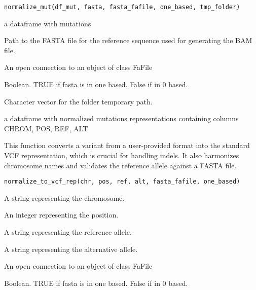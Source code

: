\documentclass[a4paper]{book}
\begin{document}
%
\begin{Usage}
\begin{verbatim}
normalize_mut(df_mut, fasta, fasta_fafile, one_based, tmp_folder)
\end{verbatim}
\end{Usage}
%
\begin{Arguments}
\begin{ldescription}
\item[\code{df\_mut}] a dataframe with mutations

\item[\code{fasta}] Path to the FASTA file for the reference sequence used for generating the BAM file.

\item[\code{fasta\_fafile}] An open connection to an object of class FaFile

\item[\code{one\_based}] Boolean. TRUE if fasta is in one based. False if in 0 based.

\item[\code{tmp\_folder}] Character vector for the folder temporary path.
\end{ldescription}
\end{Arguments}
%
\begin{Value}
a dataframe with normalized mutations representations containing columns CHROM, POS, REF, ALT
\end{Value}
%
\begin{Description}
This function converts a variant from a user-provided format into the
standard VCF representation, which is crucial for handling indels. It also
harmonizes chromosome names and validates the reference allele against a
FASTA file.
\end{Description}
%
\begin{Usage}
\begin{verbatim}
normalize_to_vcf_rep(chr, pos, ref, alt, fasta_fafile, one_based)
\end{verbatim}
\end{Usage}
%
\begin{Arguments}
\begin{ldescription}
\item[\code{chr}] A string representing the chromosome.

\item[\code{pos}] An integer representing the position.

\item[\code{ref}] A string representing the reference allele.

\item[\code{alt}] A string representing the alternative allele.

\item[\code{fasta\_fafile}] An open connection to an object of class FaFile

\item[\code{one\_based}] Boolean. TRUE if fasta is in one based. False if in 0 based.
\end{ldescription}
\end{Arguments}
\end{document}
